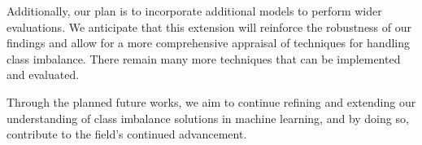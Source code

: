 \documentclass[journal]{IEEEtran}
\begin{document}
	Additionally, our plan is to incorporate additional models to perform wider evaluations. We anticipate that this extension will reinforce the robustness of our findings and allow for a more comprehensive appraisal of techniques for handling class imbalance. There remain many more techniques that can be implemented and evaluated.
	
	Through the planned future works, we aim to continue refining and extending our understanding of class imbalance solutions in machine learning, and by doing so, contribute to the field's continued advancement.
	
		
	\label{sec:references}
	
	
	
\end{document}
